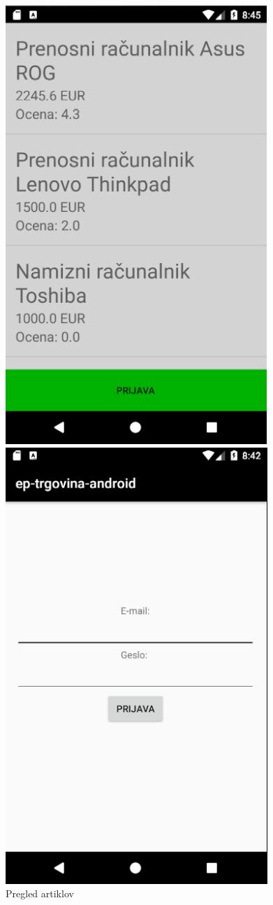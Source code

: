 \documentclass[a4paper,12pt]{report}
\begin{document}
\begin{figure}[h]
    \centering
  \includegraphics[scale=0.5]{slike/android/MainActivity.png}
    \caption{Pregled artiklov}
    \label{fig:main_activity}
\endminipage\hfill
{}
    \centering
  \includegraphics[scale=0.5]{slike/android/LoginActivity.png}

\end{figure}
\end{document}
